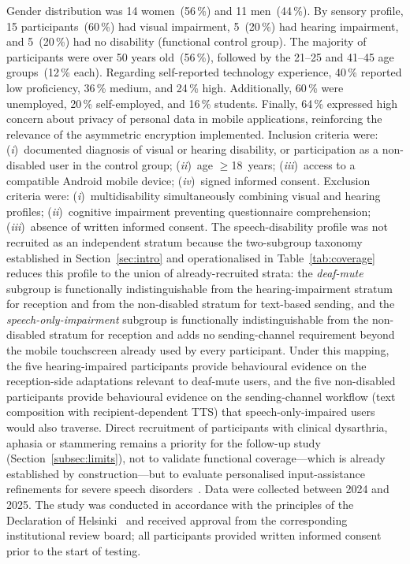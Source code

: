 \documentclass[journal]{IEEEtran}
\begin{document}
	Gender distribution was 14 women~(56\,\%) and 11 men~(44\,\%).
	By sensory profile, 15 participants~(60\,\%) had visual
	impairment, 5~(20\,\%) had hearing impairment, and 5~(20\,\%)
	had no disability (functional control group).
	The majority of participants were over 50 years old~(56\,\%),
	followed by the 21--25 and 41--45 age groups~(12\,\% each).
	Regarding self-reported technology experience, 40\,\% reported
	low proficiency, 36\,\% medium, and 24\,\% high.
	Additionally, 60\,\% were unemployed, 20\,\% self-employed,
	and 16\,\% students.
	Finally, 64\,\% expressed high concern about privacy of
	personal data in mobile applications, reinforcing the relevance
	of the asymmetric encryption implemented.
	Inclusion criteria were:
	(\textit{i})~documented diagnosis of visual or hearing disability, or
	participation as a non-disabled user in the control group;
	(\textit{ii})~age $\geq$18~years;
	(\textit{iii})~access to a compatible Android mobile device;
	(\textit{iv})~signed informed consent.
	Exclusion criteria were:
	(\textit{i})~multidisability simultaneously combining visual and hearing
	profiles;
	(\textit{ii})~cognitive impairment preventing questionnaire comprehension;
	(\textit{iii})~absence of written informed consent.
	The speech-disability profile was not recruited as an independent stratum
	because the two-subgroup taxonomy established in Section~\ref{sec:intro}
	and operationalised in Table~\ref{tab:coverage} reduces this profile to the
	union of already-recruited strata: the \emph{deaf-mute} subgroup is
	functionally indistinguishable from the hearing-impairment stratum for
	reception and from the non-disabled stratum for text-based sending, and the
	\emph{speech-only-impairment} subgroup is functionally indistinguishable
	from the non-disabled stratum for reception and adds no sending-channel
	requirement beyond the mobile touchscreen already used by every participant.
	Under this mapping, the five hearing-impaired participants provide
	behavioural evidence on the reception-side adaptations relevant to deaf-mute
	users, and the five non-disabled participants provide behavioural evidence
	on the sending-channel workflow (text composition with recipient-dependent
	TTS) that speech-only-impaired users would also traverse.
	Direct recruitment of participants with clinical dysarthria, aphasia or
	stammering remains a priority for the follow-up study (Section~\ref{subsec:limits}),
	not to validate functional coverage---which is already established by construction---but
	to evaluate personalised input-assistance refinements for severe speech
	disorders~\cite{bleakley2022,costanzo2023}.
	Data were collected between 2024 and 2025.
	The study was conducted in accordance with the principles of
	the Declaration of Helsinki~\cite{world2013} and received
	approval from the corresponding institutional review board;
	all participants provided written informed consent prior to
	the start of testing.
	
\end{document}
